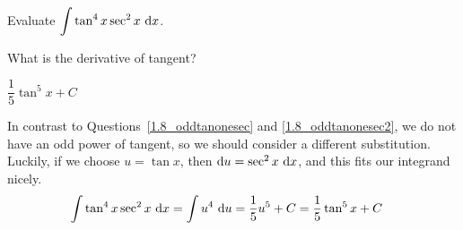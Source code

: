 \begin{question}
Evaluate $\displaystyle\int \tan^4 x \sec^2 x ~\mathrm{d}x$.
\end{question}
\begin{hint}
What is the derivative of tangent?
\end{hint}
\begin{answer}
$\dfrac{1}{5}\tan^5 x +C$
\end{answer}
\begin{solution}
In contrast to Questions~\ref{1.8_oddtanonesec} and \ref{1.8_oddtanonesec2}, we do not have an odd power of tangent, so we should consider a different substitution. Luckily, if we choose $u=\tan x$, then $\mathrm{d}u=\sec^2 x~\mathrm{d}x$, and this fits our integrand nicely.
\begin{align*}
\int \tan^4 x \sec^2 x ~\mathrm{d}x&=\int u^4~\mathrm{d}u=\frac{1}{5}u^5+C = \frac{1}{5}\tan^5 x +C
\end{align*}
\end{solution}



